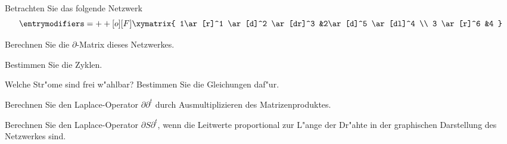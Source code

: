Betrachten Sie das folgende Netzwerk
\[
\entrymodifiers={++[o][F]}
\xymatrix{
1\ar[r]^1 \ar[d]^2 \ar[dr]^3
	&2\ar[d]^5 \ar[dl]^4
\\
3 \ar[r]^6
	&4
}
\]
\begin{teilaufgaben}
\item Berechnen Sie die $\partial$-Matrix dieses Netzwerkes.
\item Bestimmen Sie die Zyklen.
\item Welche Str"ome sind frei w"ahlbar? Bestimmen Sie die Gleichungen daf"ur.
\item Berechnen Sie den Laplace-Operator $\partial\partial^t$ 
durch Ausmultiplizieren des Matrizenproduktes.
\item Berechnen Sie den Laplace-Operator $\partial S\partial^t$, wenn
die Leitwerte proportional zur L"ange der Dr"ahte in der graphischen
Darstellung des Netzwerkes sind.
\end{teilaufgaben}


